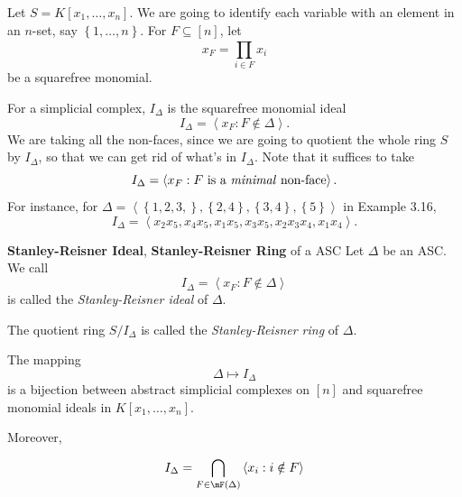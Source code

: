 \documentclass[co439]{subfiles}
\begin{document}
    \np Let $S=K\left[ x_1,\ldots,x_n \right]$. We are going to identify each variable with an element in an $n$-set, say $\left\lbrace 1,\ldots,n \right\rbrace$. For $F\subseteq\left[ n \right]$, let
    \begin{equation*}
        x_F = \prod^{}_{i\in F} x_i
    \end{equation*}
    be a squarefree monomial.

    For a simplicial complex, $I_{\Delta}$ is the squarefree monomial ideal
    \begin{equation*}
        I_{\Delta} = \left< x_F: F\notin\Delta \right>. 
    \end{equation*}
    We are taking all the non-faces, since we are going to quotient the whole ring $S$ by $I_{\Delta}$, so that we can get rid of what's in $I_{\Delta}$. Note that it suffices to take
    \begin{equation*}
        I_{\Delta} = \left< x_F: \text{$F$ is a \textit{minimal} non-face} \right>. 
    \end{equation*}
    For instance, for $\Delta = \left< \left\lbrace 1,2,3, \right\rbrace, \left\lbrace 2,4 \right\rbrace, \left\lbrace 3,4 \right\rbrace, \left\lbrace 5 \right\rbrace \right> $ in Example 3.16,
    \begin{equation*}
        I_{\Delta} = \left< x_2x_5, x_4x_5, x_1x_5, x_3x_5, x_2x_3x_4, x_1x_4 \right>. 
    \end{equation*}

    \begin{definition}{\textbf{Stanley-Reisner Ideal}, \textbf{Stanley-Reisner Ring} of a ASC}
        Let $\Delta$ be an ASC. We call
        \begin{equation*}
            I_{\Delta} = \left< x_F: F\notin\Delta \right> 
        \end{equation*}
        is called the \emph{Stanley-Reisner ideal} of $\Delta$.

        The quotient ring $S /I_{\Delta}$ is called the \emph{Stanley-Reisner ring} of $\Delta$.
    \end{definition}
    
    \begin{theorem}{}
        The mapping
        \begin{equation*}
            \Delta\mapsto I_{\Delta}
        \end{equation*}
        is a bijection between abstract simplicial complexes on $\left[ n \right]$ and squarefree monomial ideals in $K\left[ x_1,\ldots,x_n \right]$.

        Moreover,
        \begin{equation*}
            I_{\Delta} = \bigcap^{}_{F\in\mF\left( \Delta \right)}  \left< x_i: i\notin F \right> 
        \end{equation*}
    \end{theorem}
\end{document}
